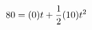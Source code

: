 \documentclass[preview]{standalone}
\begin{document}
\begin{align*}
\special{dvisvgm:raw <g id='unique000'>}80 = (0)t + \frac{1}{2}(10)t^2\special{dvisvgm:raw </g>}
\end{align*}
\end{document}
